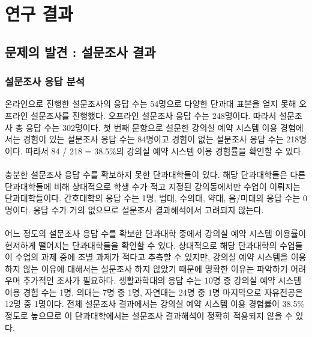 \documentclass[11pt,a4paper]{article}
\begin{document}
\section{연구 결과}

\subsection{문제의 발견 : 설문조사 결과}

\subsubsection{설문조사 응답 분석}
온라인으로 진행한 설문조사의 응답 수는 54명으로 다양한 단과대 표본을 얻지 못해 오프라인 설문조사를 진행했다. 오프라인 설문조사 응답 수는 248명이다. 따라서 설문조사 총 응답 수는 302명이다. 첫 번째 문항으로 설문한 강의실 예약 시스템 이용 경험에서는 경험이 있는 설문조사 응답 수는 84명이고 경험이 없는 설문조사 응답 수는 218명이다. 따라서 84 / 218 = 38.5\%의 강의실 예약 시스템 이용 경험률을 확인할 수 있다.
\\
\\
충분한 설문조사 응답 수를 확보하지 못한 단과대학들이 있다. 해당 단과대학들은 다른 단과대학들에 비해 상대적으로 학생 수가 적고 지정된 강의동에서만 수업이 이뤄지는 단과대학들이다. 간호대학의 응답 수는 1명, 법대, 수의대, 약대, 음/미대의 응답 수는 0명이다. 응답 수가 거의 없으므로 설문조사 결과해석에서 고려되지 않는다.
\\
\\
어느 정도의 설문조사 응답 수를 확보한 단과대학 중에서 강의실 예약 시스템 이용률이 현저하게 떨어지는 단과대학들을 확인할 수 있다. 상대적으로 해당 단과대학의 수업들이 수업의 과제 중에 조별 과제가 적다고 추측할 수 있지만, 강의실 예약 시스템을 이용하지 않는 이유에 대해서는 설문조사 하지 않았기 때문에 명확한 이유는 파악하기 어려우며 추가적인 조사가 필요하다. 생활과학대의 응답 수는 10명 중 강의실 예약 시스템 이용 경험 수는 1명, 의대는 7명 중 1명, 자연대는 24명 중 1명 마지막으로 자유전공은 12명 중 1명이다. 전체 설문조사 결과에서는 강의실 예약 시스템 이용 경험률이 38.5\% 정도로 높으므로 이 단과대학에서는 설문조사 결과해석이 정확히 적용되지 않을 수 있다.
\end{document}
